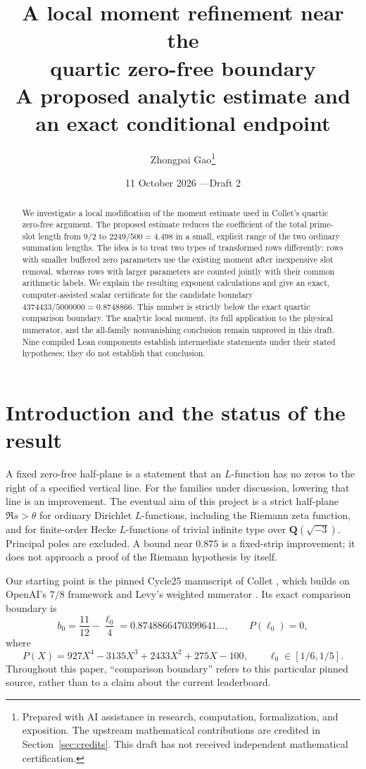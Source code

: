 \documentclass[11pt]{article}
\title{A local moment refinement near the\protect\\quartic zero-free boundary\\[6pt]
\large A proposed analytic estimate and an exact conditional endpoint}
\author{Zhongpai Gao\thanks{Prepared with AI assistance in research, computation, formalization, and exposition. The upstream mathematical contributions are credited in Section~\ref{sec:credits}. This draft has not received independent mathematical certification.}}
\date{11 October 2026 \quad---\quad Draft 2}
\theoremstyle{definition}
\newcommand{\Q}{\mathbf Q}
\begin{document}
\maketitle
\begin{abstract}
We investigate a local modification of the moment estimate used in Collet's
quartic zero-free argument. The proposed estimate reduces the coefficient
of the total prime-slot length from $9/2$ to $2249/500=4.498$ in a small,
explicit range of the two ordinary summation lengths. The idea is to
treat two types of transformed rows differently: rows with smaller
buffered zero parameters use the existing moment after inexpensive slot
removal, whereas rows with larger parameters are counted jointly with
their common arithmetic labels. We explain the resulting exponent
calculations and give an exact, computer-assisted scalar certificate for
the candidate boundary $4374433/5000000=0.8748866$.
This number is strictly below the exact quartic comparison boundary.
The analytic local moment, its full application to the physical numerator,
and the all-family nonvanishing conclusion remain unproved in this draft.
Nine compiled Lean components establish intermediate statements under
their stated hypotheses; they do not establish that conclusion.
\end{abstract}

\section{Introduction and the status of the result}

A fixed zero-free half-plane is a statement that an $L$-function has no
zeros to the right of a specified vertical line. For the families under
discussion, lowering that line is an improvement. The eventual aim of
this project is a strict half-plane $\Re s>\theta$ for ordinary Dirichlet
$L$-functions, including the Riemann zeta function, and for finite-order
Hecke $L$-functions of trivial infinite type over $\Q(\sqrt{-3})$.
Principal poles are excluded. A bound near $0.875$ is a fixed-strip
improvement; it does not approach a proof of the Riemann hypothesis by
itself.

Our starting point is the pinned Cycle25 manuscript of Collet
\cite{collet}, which builds on OpenAI's $7/8$ framework \cite{openai}
and Levy's weighted numerator \cite{levy}. Its exact comparison boundary is
\begin{equation}\label{eq:quartic}
 b_0=\frac{11}{12}-\frac{\ell_0}{4}
     =0.8748866470399641\ldots,
 \qquad
 P(\ell_0)=0,
\end{equation}
where
\[
 P(X)=927X^4-3135X^3+2433X^2+275X-100,
 \qquad \ell_0\in[1/6,1/5].
\]
Throughout this paper, ``comparison boundary'' refers to this particular
pinned source, rather than to a claim about the current leaderboard.
\end{document}
